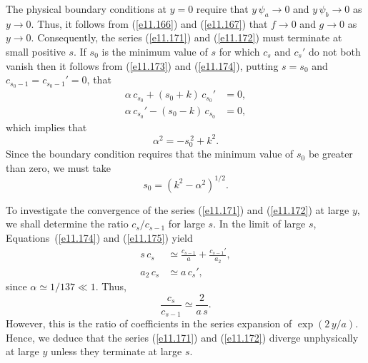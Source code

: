 The physical boundary conditions at $y=0$ require that $y\,\psi_a\rightarrow 0$ and $y\,\psi_b\rightarrow 0$ as $y\rightarrow 0$. Thus, it
follows from (\ref{e11.166}) and (\ref{e11.167}) that $f\rightarrow 0$ and $g\rightarrow 0$ as $y\rightarrow 0$. 
Consequently, the series (\ref{e11.171}) and (\ref{e11.172}) must terminate at small positive $s$. If $s_0$ is the minimum value of $s$
for which $c_s$ and $c_s'$ do not both vanish then it follows from (\ref{e11.173}) and (\ref{e11.174}), putting $s=s_0$ and
$c_{s_0-1}=c_{s_0-1}'=0$, that
\begin{align}
\alpha\,c_{s_0}+(s_0+k)\,c_{s_0}'&=0,\\[0.5ex]
\alpha\,c_{s_0}' - (s_0-k)\,c_{s_0} &=0,
\end{align}
which implies that
\begin{equation}
\alpha^2 = - s_0^{\,2} + k^2.
\end{equation}
Since the boundary condition requires that the minimum value of $s_0$ be greater than zero, we must take
\begin{equation}
s_0 = (k^2-\alpha^2)^{1/2}.
\end{equation}

To investigate the convergence of the series (\ref{e11.171}) and (\ref{e11.172}) at large $y$, we shall determine the
ratio $c_s/c_{s-1}$ for large $s$. In the limit of large $s$, Equations~(\ref{e11.174}) and (\ref{e11.175}) yield
\begin{align}
s\,c_s&\simeq \frac{c_{s-1}}{a}+\frac{c_{s-1}'}{a_2},\\[0.5ex]
a_2\,c_s&\simeq a\,c_s',
\end{align}
since $\alpha\simeq 1/137 \ll 1$. Thus,
\begin{equation}
\frac{c_s}{c_{s-1}}\simeq \frac{2}{a\,s}.
\end{equation}
However, this is the ratio of coefficients in the series expansion of $\exp(2\,y/a)$. Hence, we deduce that the series  (\ref{e11.171}) and (\ref{e11.172}) diverge
unphysically at large $y$ unless they terminate at large $s$. 

